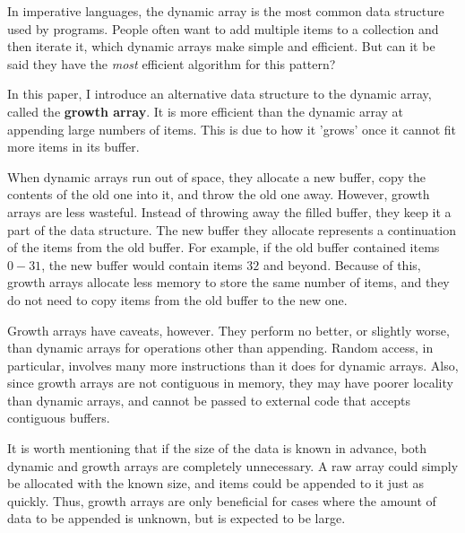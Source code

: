 In imperative languages, the dynamic array is the most common data structure used by programs. People often want to add multiple items to a collection and then iterate it, which dynamic arrays make simple and efficient. But can it be said they have the \textit{most} efficient algorithm for this pattern?

In this paper, I introduce an alternative data structure to the dynamic array, called the \textbf{growth array}. It is more efficient than the dynamic array at appending large numbers of items. This is due to how it 'grows' once it cannot fit more items in its buffer.

When dynamic arrays run out of space, they allocate a new buffer, copy the contents of the old one into it, and throw the old one away. However, growth arrays are less wasteful. Instead of throwing away the filled buffer, they keep it a part of the data structure. The new buffer they allocate represents a continuation of the items from the old buffer. For example, if the old buffer contained items $0 - 31$, the new buffer would contain items $32$ and beyond. Because of this, growth arrays allocate less memory to store the same number of items, and they do not need to copy items from the old buffer to the new one.

Growth arrays have caveats, however. They perform no better, or slightly worse, than dynamic arrays for operations other than appending. Random access, in particular, involves many more instructions than it does for dynamic arrays. Also, since growth arrays are not contiguous in memory, they may have poorer locality than dynamic arrays, and cannot be passed to external code that accepts contiguous buffers.

It is worth mentioning that if the size of the data is known in advance, both dynamic and growth arrays are completely unnecessary. A raw array could simply be allocated with the known size, and items could be appended to it just as quickly. Thus, growth arrays are only beneficial for cases where the amount of data to be appended is unknown, but is expected to be large.